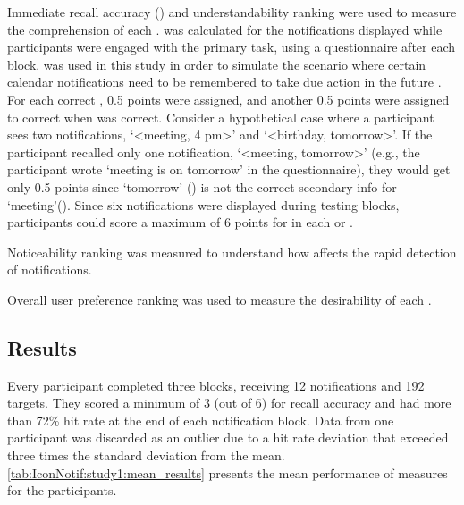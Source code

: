\factor{\Comprehension{}}
Immediate recall accuracy (\immediateRecall{}) and understandability ranking were used to measure the comprehension of each \format{}. \immediateRecall{} was calculated for the notifications displayed while participants were engaged with the primary task, using a questionnaire after each block. 
\immediateRecall{} was used in this study in order to simulate the scenario where certain calendar notifications need to be remembered to take due action in the future \cite{tungare_exploratory_2008, kelley_how_1982}.
For each correct \primaryinfo{}, 0.5 points were assigned, and another 0.5 points were assigned to correct \secondaryinfo{} when \primaryinfo{} was correct.
Consider a hypothetical case where a participant sees two notifications, `<meeting, 4 pm>' and `<birthday, tomorrow>'. If the participant recalled only one notification, `<meeting, tomorrow>' (e.g., the participant wrote `meeting is on tomorrow' in the questionnaire), they would get only 0.5 points since `tomorrow' (\secondaryinfo{}) is not the correct secondary info for `meeting'(\primaryinfo{}). Since six notifications were displayed during testing blocks, participants could score a maximum of 6 points for \immediateRecall{} in each \textnotif{} or \iconnotif{} \format{}.

\factor{\Reaction{}}
Noticeability ranking was measured to understand how \format{} affects the rapid detection of notifications.

\factor{\Satisfaction{}}
Overall user preference ranking was used to measure the desirability of each \format{}.




\subsection{Results}
\label{sec:IconNotif:study1:results}

Every participant completed three blocks, receiving 12 notifications and 192 targets. They scored a minimum of 3 (out of 6) for recall accuracy and had more than 72\% hit rate at the end of each notification block. Data from one participant was discarded as an outlier due to a hit rate deviation that exceeded three times the standard deviation from the mean. \autoref{tab:IconNotif:study1:mean_results} presents the mean performance of measures for the participants.

